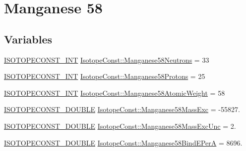\hypertarget{group___isotope_const-_manganese-_mn58}{}\section{Manganese 58}
\label{group___isotope_const-_manganese-_mn58}
\subsection*{Variables}
\begin{DoxyCompactItemize}
\item 
\mbox{\hyperlink{group___isotope_const-_macros_ga5f18360b3e99483a35c32d789e62621c}{I\+S\+O\+T\+O\+P\+E\+C\+O\+N\+S\+T\+\_\+\+I\+NT}} \mbox{\hyperlink{group___isotope_const-_manganese-_mn58_ga23b418514125225713213185bbea35ec}{Isotope\+Const\+::\+Manganese58\+Neutrons}} = 33
\item 
\mbox{\hyperlink{group___isotope_const-_macros_ga5f18360b3e99483a35c32d789e62621c}{I\+S\+O\+T\+O\+P\+E\+C\+O\+N\+S\+T\+\_\+\+I\+NT}} \mbox{\hyperlink{group___isotope_const-_manganese-_mn58_ga51f4d8408a18696a6d2684a6196ee3d5}{Isotope\+Const\+::\+Manganese58\+Protons}} = 25
\item 
\mbox{\hyperlink{group___isotope_const-_macros_ga5f18360b3e99483a35c32d789e62621c}{I\+S\+O\+T\+O\+P\+E\+C\+O\+N\+S\+T\+\_\+\+I\+NT}} \mbox{\hyperlink{group___isotope_const-_manganese-_mn58_ga1a77e9a6189daf81aba33915523fa825}{Isotope\+Const\+::\+Manganese58\+Atomic\+Weight}} = 58
\item 
\mbox{\hyperlink{group___isotope_const-_macros_ga8f45a7272ce02c0b4c65c44636ed719a}{I\+S\+O\+T\+O\+P\+E\+C\+O\+N\+S\+T\+\_\+\+D\+O\+U\+B\+LE}} \mbox{\hyperlink{group___isotope_const-_manganese-_mn58_ga9bff0f039b3c10b270b46618c1967b29}{Isotope\+Const\+::\+Manganese58\+Mass\+Exc}} = -\/55827.
\item 
\mbox{\hyperlink{group___isotope_const-_macros_ga8f45a7272ce02c0b4c65c44636ed719a}{I\+S\+O\+T\+O\+P\+E\+C\+O\+N\+S\+T\+\_\+\+D\+O\+U\+B\+LE}} \mbox{\hyperlink{group___isotope_const-_manganese-_mn58_ga18893e24c9e88532b2b786e6f3481fd3}{Isotope\+Const\+::\+Manganese58\+Mass\+Exc\+Unc}} = 2.
\item 
\mbox{\hyperlink{group___isotope_const-_macros_ga8f45a7272ce02c0b4c65c44636ed719a}{I\+S\+O\+T\+O\+P\+E\+C\+O\+N\+S\+T\+\_\+\+D\+O\+U\+B\+LE}} \mbox{\hyperlink{group___isotope_const-_manganese-_mn58_ga1ad59cf24473b919af2f3d96004bf07b}{Isotope\+Const\+::\+Manganese58\+Bind\+E\+PerA}} = 8696.
\item 

\end{DoxyCompactItemize}
